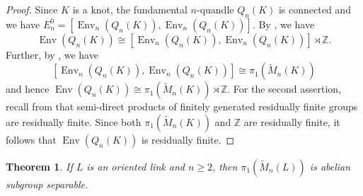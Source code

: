 \documentclass[12pt]{amsart}
\newtheorem{theorem}{Theorem}[section]
\theoremstyle{definition}
\numberwithin{equation}{subsection}
\newcommand{\Env}{\operatorname{Env}}
\begin{document}
\begin{proof}
Since $K$ is a knot, the fundamental $n$-quandle $Q_n(K)$ is connected and we have $E_n^0 =[\Env_n(Q_{n}(K)),\Env_n(Q_{n}(K))]$. By \cite[Corollary 4.2]{MR4447657}, we have
	$$
	\Env(Q_n(K)) \cong [\Env_n(Q_{n}(K)),\Env_n(Q_{n}(K))] \rtimes \mathbb{Z}.
	$$
Further, by \cite[Remark 5.1.5, Theorem 5.2.2]{MR2634013}, we have
	$$
	[\Env_n(Q_{n}(K)),\Env_n(Q_{n}(K))] \cong \pi_{1}(\widetilde{M}_{n}(K))
	$$
and hence $\Env(Q_n(K)) \cong \pi_{1}(\widetilde{M}_{n}(K)) \rtimes \mathbb{Z}$. For the second assertion, recall from \cite[Theorem 7]{MR0310044} that  semi-direct products of finitely generated residually finite groups are residually finite. Since both $\pi_{1}(\widetilde{M}_{n}(K))$ and $\mathbb{Z}$ are residually finite,  it follows that $\Env\left(Q_{n}(K)\right)$ is residually finite. 
\end{proof}

\begin{theorem}\label{piM abelian subgroup separable}
If $L$ is an oriented link and $n \ge 2$, then $\pi_{1}(\widetilde{M}_{n}(L))$ is abelian subgroup separable.
\end{theorem}
\end{document}
